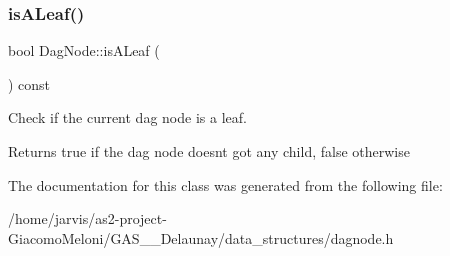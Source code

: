 \subsubsection{\texorpdfstring{is\+A\+Leaf()}{isALeaf()}}
{\footnotesize\ttfamily bool Dag\+Node\+::is\+A\+Leaf (\begin{DoxyParamCaption}{ }\end{DoxyParamCaption}) const\hspace{0.3cm}{\ttfamily [inline]}}



Check if the current dag node is a leaf. 

\begin{DoxyReturn}{Returns}
true if the dag node doesn\textquotesingle{}t got any child, false otherwise 
\end{DoxyReturn}


The documentation for this class was generated from the following file\+:\begin{DoxyCompactItemize}
\item 
/home/jarvis/as2-\/project-\/\+Giacomo\+Meloni/\+G\+A\+S\+\_\+\_\+\+Delaunay/data\+\_\+structures/dagnode.\+h\end{DoxyCompactItemize}
